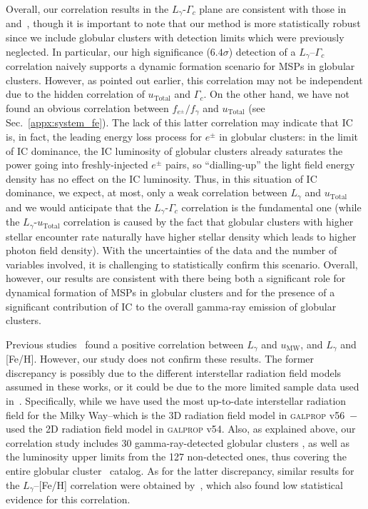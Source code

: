 \documentclass[doublespace,nopageskip]{VTthesis}
\begin{document}
Overall, our correlation results in the $L_\gamma$-$\Gamma_c$ plane are consistent with those in \citet{2011ApJ...726..100H} and~\citet{2019MNRAS.486..851D}, though it is important to note that our method is more statistically robust since we include globular clusters with detection limits which were previously neglected. In particular, our high significance ($6.4\sigma$) detection of a $L_\gamma$--$\Gamma_c$ correlation naively supports a dynamic formation scenario for MSPs in globular clusters. However, as pointed out earlier, this correlation may not be independent due to the hidden correlation of $u_\mathrm{Total}$ and $\Gamma_c$. On the other hand, we have not found an obvious correlation between $f_{e^\pm}/f_\gamma$ and $u_\mathrm{Total}$ (see Sec.~\ref{appx:system_fe}). The lack of this latter correlation may indicate that IC is, in fact, the leading energy loss process for $e^\pm$ in globular clusters: in the limit of IC dominance, the IC luminosity of globular clusters already saturates the power going into freshly-injected $e^\pm$ pairs, so ``dialling-up'' the light field energy density has no effect on the IC luminosity. Thus, in this situation of IC dominance, we expect, at most, only a weak correlation between $L_\gamma$ and $u_\mathrm{Total}$ and we would anticipate that the $L_\gamma$-$\Gamma_c$ correlation is the fundamental one (while the $L_\gamma$-$u_\mathrm{Total}$ correlation is caused by the fact that globular clusters with higher stellar encounter rate naturally have higher stellar density which leads to higher photon field density). With the uncertainties of the data and the number of variables involved, it is challenging to statistically confirm this scenario. Overall, however, our results are consistent with there being both a significant role for dynamical formation of MSPs in globular clusters and for the presence of a significant contribution of IC to the overall gamma-ray emission of globular clusters.

Previous studies~\citep{2011ApJ...726..100H} found a positive correlation between $L_\gamma$ and $u_\mathrm{MW}$, and $L_\gamma$ and [Fe/H]. However, our study does not confirm these results. The former discrepancy is possibly due to the different interstellar radiation field models assumed in these works, or it could be due to the more limited sample data used in~\cite{2011ApJ...726..100H}. Specifically, while we have used the most up-to-date interstellar radiation field for the Milky Way--which is the 3D radiation field model in \textsc{galprop} v56~\citep{2017ApJ...846...67P}$-$~\citet{2011ApJ...726..100H} used the 2D radiation field model in \textsc{galprop} v54. Also, as explained above, our correlation study includes 30 gamma-ray-detected globular clusters , as well as the luminosity upper limits from the 127 non-detected ones, thus covering the entire globular cluster~\citet{1996AJ....112.1487H} catalog. As for the latter discrepancy, similar results for the $L_\gamma$--[Fe/H] correlation were obtained by~\citet{2019MNRAS.486..851D}, which also found low statistical evidence for this correlation.
\end{document}
